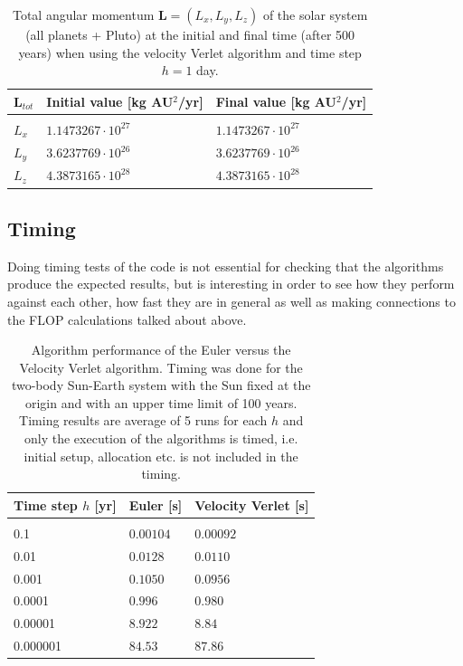 \documentclass[12pt]{article}
\numberwithin{figure}{section}
\numberwithin{table}{section}
\begin{document}
\begin{table}[ht]
\begin{center}
  \begin{tabular}{| l | l | l |}
  \hline
    $\mathbf{L}_{tot}$ &  Initial value [kg AU$^2$/yr] & Final value [kg AU$^2$/yr]\\[0.10cm]\hline\hline
     & &\\
     $L_x$ & $1.1473267\cdot 10^{27}$ & $1.1473267\cdot 10^{27}$\\[0.10cm]
     $L_y$ & $3.6237769\cdot 10^{26}$ & $3.6237769\cdot 10^{26}$\\[0.10cm]
     $L_z$ & $4.3873165\cdot 10^{28}$ & $4.3873165\cdot 10^{28}$\\[0.10cm]
     \hline
  \end{tabular}
\end{center}
\caption{Total angular momentum $\mathbf{L}=(L_x,L_y,L_z)$ of the solar system (all planets + Pluto) at the initial and final time (after 500 years) when using the velocity Verlet algorithm and time step $h=1$ day.}
\label{tab:ang_mom_solar_system}
\end{table}

\subsection{Timing}
Doing timing tests of the code is not essential for checking that the algorithms produce the expected results, but is interesting in order to see how they perform against each other, how fast they are in general as well as making connections to the FLOP calculations talked about above.

\begin{table}[ht]
\begin{center}
  \begin{tabular}{| l | l | l |}
  \hline
    Time step $h$ [yr] &  Euler [s] & Velocity Verlet [s]\\[0.10cm]\hline\hline
     & &\\
     0.1 & $0.00104$ & $0.00092$\\[0.10cm]
     0.01 & $0.0128$ & $0.0110$\\[0.10cm]
     0.001 & $0.1050$ & $0.0956$\\[0.10cm]
     0.0001 & $0.996$ & $0.980$\\[0.10cm]
     0.00001 & $8.922$ & $8.84$\\[0.10cm]
     0.000001 & $84.53$ & $87.86$\\[0.10cm]
     \hline
  \end{tabular}
\end{center}
\caption{Algorithm performance of the Euler versus the Velocity Verlet algorithm. Timing was done for the two-body Sun-Earth system with the Sun fixed at the origin and with an upper time limit of 100 years. Timing results are average of 5 runs for each $h$ and only the execution of the algorithms is timed, i.e. initial setup, allocation etc. is not included in the timing.}
\label{tab:timing}
\end{table}
\end{document}
